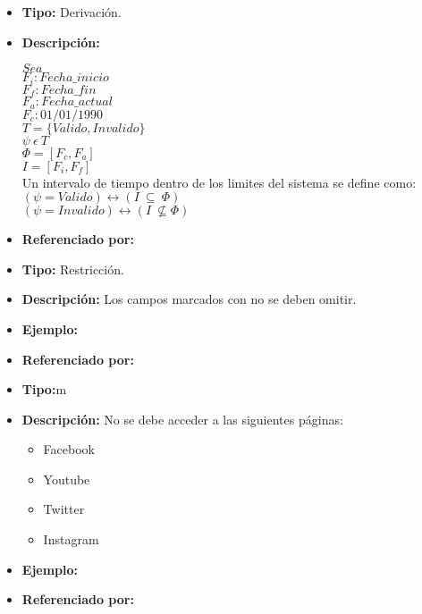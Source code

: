 \begin{itemize}
  \item \textbf{Tipo:} Derivación. 
  \item \textbf{Descripción:} 

  $Sea$\\

  $F_i:Fecha\_inicio$\\
  $F_f:Fecha\_fin$\\
  $F_a:Fecha\_actual$\\
  $F_c:01/01/1990$\\

  $T=\{Valido,Invalido\}$\\
  $\psi\ \epsilon\ T$\\

  $\Phi=[F_c,F_a]$\\
  $I=[F_i,F_f]$\\
  

  Un intervalo de tiempo dentro de los limites del sistema se define como:\\

  $(\psi=Valido)\leftrightarrow(I\ \subseteq\ \Phi)$\\
  $(\psi=Invalido)\leftrightarrow(I\ \nsubseteq \Phi)$\\

  \item \textbf{Referenciado por:}  \\
\end{itemize}


\begin{itemize}
  \item \textbf{Tipo:} Restricción.  
  \item \textbf{Descripción:} Los campos marcados con \* no se deben omitir.
  \item \textbf{Ejemplo:} 
  \item \textbf{Referenciado por:}  \\
\end{itemize}

\begin{itemize}
  \item \textbf{Tipo:}m
  \item \textbf{Descripción:} No se debe acceder a las siguientes páginas:
    \begin{itemize}
        \item Facebook
        \item Youtube
        \item Twitter
        \item Instagram 
    \end{itemize} 
  \item \textbf{Ejemplo:}
  \item \textbf{Referenciado por:}   \\
\end{itemize}


